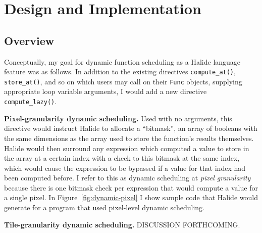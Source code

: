 \documentclass{article}
\begin{document}
\section{Design and Implementation}

\subsection{Overview}

Conceptually, my goal for dynamic function scheduling as a Halide language feature was as follows. In addition to the existing directives \texttt{compute\_at()}, \texttt{store\_at()}, and so on which users may call on their \texttt{Func} objects, supplying appropriate loop variable arguments, I would add a new directive \texttt{compute\_lazy()}.

{\bf Pixel-granularity dynamic scheduling.} Used with no arguments, this directive would instruct Halide to allocate a ``bitmask'', an array of booleans with the same dimensions as the array used to store the function's results themselves. Halide would then surround any expression which computed a value to store in the array at a certain index with a check to this bitmask at the same index, which would cause the expression to be bypassed if a value for that index had been computed before. I refer to this as dynamic scheduling at {\em pixel granularity} because there is one bitmask check per expression that would compute a value for a single pixel. In Figure~\ref{fig:dynamic-pixel} I show sample code that Halide would generate for a program that used pixel-level dynamic scheduling.

{\bf Tile-granularity dynamic scheduling.} DISCUSSION FORTHCOMING.
\end{document}
